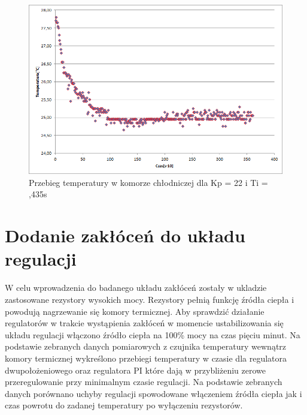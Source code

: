 \documentclass[oneside]{mgr}
\begin{document}
\begin{center}
\begin{figure}[h!]
    \centering
    \includegraphics[width=\textwidth]{ZN13.png}
    \caption{Przebieg temperatury w komorze chłodniczej dla Kp = 22 i Ti = ,435s}
    \end{figure}
\end{center}
\newpage
\section{Dodanie zakłóceń do układu regulacji}
W celu wprowadzenia do badanego układu zakłóceń zostały w ukladzie zastosowane rezystory wysokich mocy. Rezystory pełnią funkcję źródła ciepła i powodują nagrzewanie się komory termicznej. Aby sprawdzić działanie regulatorów w trakcie wystąpienia zakłóceń w momencie ustabilizowania się układu regulacji włączono źródło ciepła na 100\% mocy na czas pięciu minut. Na podstawie zebranych danych pomiarowych z czujnika temperatury wewnątrz komory termicznej wykreślono przebiegi temperatury w czasie dla regulatora dwupołożeniowego oraz regulatora PI które dają w przybliżeniu zerowe przeregulowanie przy minimalnym czasie regulacji. Na podstawie zebranych danych porównano uchyby regulacji spowodowane włączeniem źródła ciepła jak i czas powrotu do zadanej temperatury po wyłączeniu rezystorów.
\end{document}
